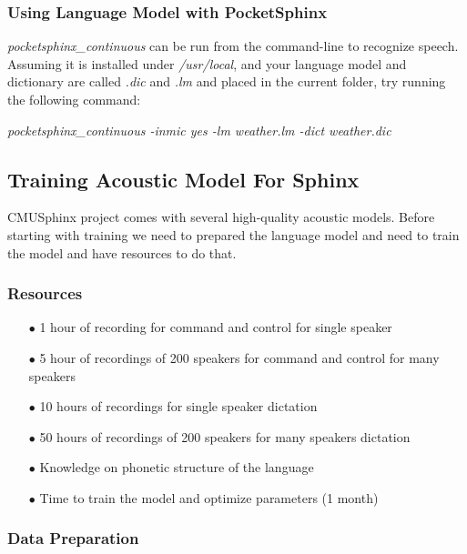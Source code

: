 \documentclass[12pt,a4paper,oneside]{memoir}
\begin{document}
\subsubsection{Using Language Model with PocketSphinx}

\textit{pocketsphinx\_continuous} can be run from the command-line to recognize speech. Assuming it is installed under \textit{/usr/local}, and your language model and dictionary are called \textit{.dic} and \textit{.lm} and placed in the current folder, try running the following command: 

\textit{pocketsphinx\_continuous -inmic yes -lm weather.lm -dict weather.dic}


\subsection{Training Acoustic Model For Sphinx}
CMUSphinx project comes with several high-quality acoustic models. Before starting with training we need to prepared the language model and  need to train the model and have resources to do that.

\subsubsection{Resources}
\begin{itemize}
 \item[$\bullet$] 1 hour of recording for command and control for single speaker
 \item[$\bullet$] 5 hour of recordings of 200 speakers for command and control for many speakers
 \item[$\bullet$] 10 hours of recordings for single speaker dictation
 \item[$\bullet$] 50 hours of recordings of 200 speakers for many speakers dictation
 \item[$\bullet$] Knowledge on phonetic structure of the language
 \item[$\bullet$] Time to train the model and optimize parameters (1 month)
\end{itemize}

\subsubsection{Data Preparation}
\end{document}
